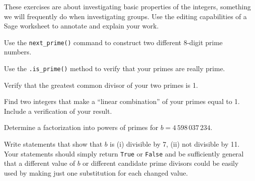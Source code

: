 These exercises are about investigating basic properties of the integers, something we will frequently do when investigating groups.  Use the editing capabilities of a Sage worksheet to annotate and explain your work.
\begin{sageverbatim}\end{sageverbatim}
%
%
Use the \verb?next_prime()? command to construct two different 8-digit prime numbers.
\begin{sageverbatim}\end{sageverbatim}
%
%
Use the \verb?.is_prime()? method to verify that your primes are really prime.
\begin{sageverbatim}\end{sageverbatim}
%
%
Verify that the greatest common divisor of your two primes is 1.
\begin{sageverbatim}\end{sageverbatim}
%
%
Find two integers that make a ``linear combination'' of your primes equal to 1.  Include a verification of your result.
\begin{sageverbatim}\end{sageverbatim}
%
%
Determine a factorization into powers of primes for $b=4\,598\,037\,234$.
\begin{sageverbatim}\end{sageverbatim}
%
%
Write statements that show that $b$ is (i) divisible by 7, (ii) not divisible by 11.  Your statements should simply return \verb?True? or \verb?False? and be sufficiently general that a different value of $b$ or different candidate prime divisors could be easily used by making just one substitution for each changed value.
\begin{sageverbatim}\end{sageverbatim}
%

